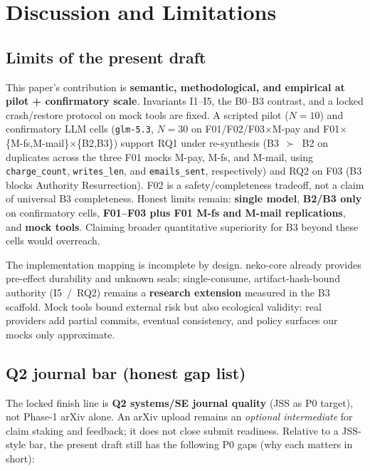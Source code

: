 \documentclass[11pt,a4paper]{article}
\begin{document}
\section{Discussion and Limitations}
\label{sec:discussion}

\subsection{Limits of the present draft}

This paper's contribution is \textbf{semantic, methodological, and
empirical at pilot + confirmatory scale}. Invariants I1--I5, the B0--B3
contrast, and a locked crash/restore protocol on mock tools are fixed. A
scripted pilot ($N{=}10$) and confirmatory LLM cells (\texttt{glm-5.3},
$N{=}30$ on F01/F02/F03$\times$M-pay and F01$\times$\{M-fs,M-mail\}$\times$\{B2,B3\})
support RQ1 under re-synthesis (B3~$\succ$~B2 on duplicates across the
three F01 mocks M-pay, M-fs, and M-mail, using \texttt{charge\_count},
\texttt{writes\_len}, and \texttt{emails\_sent}, respectively) and RQ2 on F03 (B3
blocks Authority Resurrection). F02 is a safety/completeness tradeoff,
not a claim of universal B3 completeness. Honest limits remain:
\textbf{single model}, \textbf{B2/B3 only} on confirmatory cells,
\textbf{F01--F03 plus F01 M-fs and M-mail replications}, and \textbf{mock tools}.
Claiming broader quantitative superiority for B3 beyond these cells would
overreach.

The implementation mapping is incomplete by design. neko-core already
provides pre-effect durability and unknown seals; single-consume,
artifact-hash-bound authority (I5~/~RQ2) remains a \textbf{research
extension} measured in the B3 scaffold. Mock tools bound external risk but
also ecological validity: real providers add partial commits, eventual
consistency, and policy surfaces our mocks only approximate.

\subsection{Q2 journal bar (honest gap list)}
\label{sec:q2-bar}

The locked finish line is \textbf{Q2 systems/SE journal quality} (JSS as
P0 target), not Phase-1 arXiv alone. An arXiv upload remains an
\emph{optional intermediate} for claim staking and feedback; it does not
close submit readiness. Relative to a JSS-style bar, the present draft
still has the following P0 gaps (why each matters in short):
\end{document}
